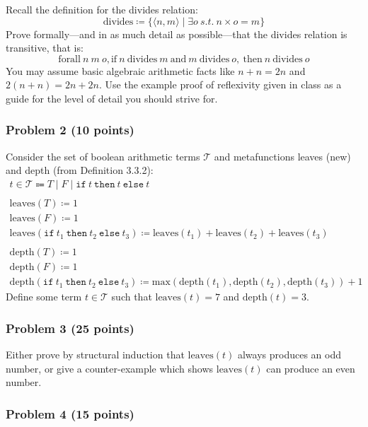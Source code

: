 \documentclass{article}
\begin{document}
Recall the definition for the divides relation:
\[ \text{divides} \coloneqq \{ \langle n,m \rangle  \mid \exists o\ \textit{s.t.}\ n \times o = m \} \]
Prove formally---and in as much detail as possible---that the divides relation
is transitive, that is:
\[ \text{forall}\ n\ m\ o, \text{if}\ n\ \text{divides}\ m\ \text{and}\ m\ \text{divides}\ o,\ \text{then}\ n\ \text{divides}\ o \]
You may assume basic algebraic arithmetic facts like $n+n=2n$ and $2(n+n) =
2n+2n$. Use the example proof of reflexivity given in class as a guide for the
level of detail you should strive for.

\subsubsection*{Problem 2 (10 points)}

Consider the set of boolean arithmetic terms $\mathcal{T}$ and metafunctions leaves (new) and depth (from Definition 3.3.2):
\[ \begin{array}{l}
   t \in \mathcal{T} \Coloneqq T \mid F \mid \texttt{if}\ t\ \texttt{then}\ t\ \texttt{else}\ t
   \\
   \\ \text{leaves}(T) \coloneqq 1
   \\ \text{leaves}(F) \coloneqq 1
   \\ \text{leaves}(\texttt{if}\ t_1\ \texttt{then}\ t_2\ \texttt{else}\ t_3) 
      \coloneqq \text{leaves}(t_1) + \text{leaves}(t_2) + \text{leaves}(t_3)
   \\
   \\ \text{depth}(T) \coloneqq 1
   \\ \text{depth}(F) \coloneqq 1
   \\ \text{depth}(\texttt{if}\ t_1\ \texttt{then}\ t_2\ \texttt{else}\ t_3) 
      \coloneqq \text{max}(\text{depth}(t_1),\text{depth}(t_2),\text{depth}(t_3)) + 1
   \end{array}
\]
Define some term $t \in \mathcal{T}$ such that $\text{leaves}(t) = 7$ and $\text{depth}(t) = 3$.

\subsubsection*{Problem 3 (25 points)}

Either prove by structural induction that $\text{leaves}(t)$ always produces an
odd number, or give a counter-example which shows $\text{leaves}(t)$ can produce
an even number.

\subsubsection*{Problem 4 (15 points)}
\end{document}
